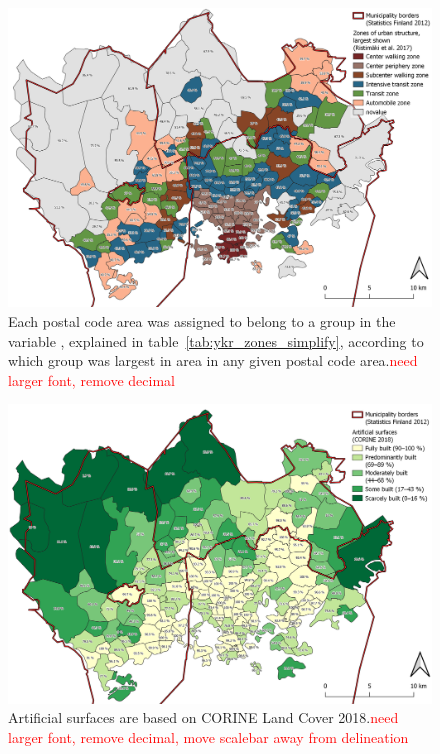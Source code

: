 \begin{figure}[H]%
    \centering
    \includegraphics[width=\textwidth]{images/thesis_postalvis_ykrzone.png}
    \caption[Calculated zones of urban structure in the research area]{Each postal code area was assigned to belong to a group in the variable , explained in table~\ref{tab:ykr_zones_simplify}, according to which group was largest in area in any given postal code area.\textcolor{red}{need larger font, remove decimal}}%
    \label{fig:postalvis_ykrzone}%
\end{figure}

\begin{figure}[H]%
    \centering
    \includegraphics[width=\textwidth]{images/thesis_postalvis_artificial.png}
    \caption[Calculated zones of built surfaces in the research area]{Artificial surfaces are based on CORINE Land Cover 2018.\textcolor{red}{need larger font, remove decimal, move scalebar away from delineation}}%
    \label{fig:postalvis_artificial}%
\end{figure}

